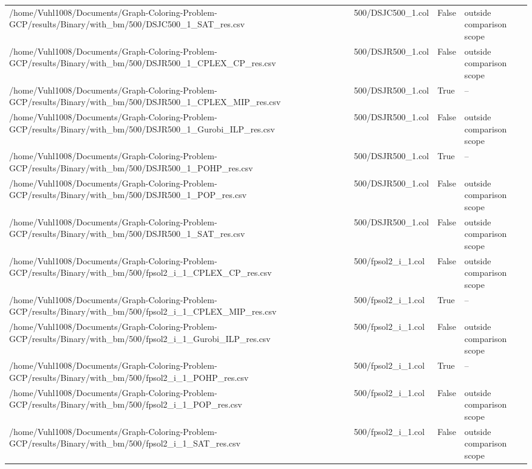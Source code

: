 \begin{table}[htbp]
\begin{tabular}{llll}
/home/Vuhl1008/Documents/Graph-Coloring-Problem-GCP/results/Binary/with\_bm/500/DSJC500\_1\_SAT\_res.csv & 500/DSJC500\_1.col & False & outside comparison scope \\
/home/Vuhl1008/Documents/Graph-Coloring-Problem-GCP/results/Binary/with\_bm/500/DSJR500\_1\_CPLEX\_CP\_res.csv & 500/DSJR500\_1.col & False & outside comparison scope \\
/home/Vuhl1008/Documents/Graph-Coloring-Problem-GCP/results/Binary/with\_bm/500/DSJR500\_1\_CPLEX\_MIP\_res.csv & 500/DSJR500\_1.col & True & -- \\
/home/Vuhl1008/Documents/Graph-Coloring-Problem-GCP/results/Binary/with\_bm/500/DSJR500\_1\_Gurobi\_ILP\_res.csv & 500/DSJR500\_1.col & False & outside comparison scope \\
/home/Vuhl1008/Documents/Graph-Coloring-Problem-GCP/results/Binary/with\_bm/500/DSJR500\_1\_POHP\_res.csv & 500/DSJR500\_1.col & True & -- \\
/home/Vuhl1008/Documents/Graph-Coloring-Problem-GCP/results/Binary/with\_bm/500/DSJR500\_1\_POP\_res.csv & 500/DSJR500\_1.col & False & outside comparison scope \\
/home/Vuhl1008/Documents/Graph-Coloring-Problem-GCP/results/Binary/with\_bm/500/DSJR500\_1\_SAT\_res.csv & 500/DSJR500\_1.col & False & outside comparison scope \\
/home/Vuhl1008/Documents/Graph-Coloring-Problem-GCP/results/Binary/with\_bm/500/fpsol2\_i\_1\_CPLEX\_CP\_res.csv & 500/fpsol2\_i\_1.col & False & outside comparison scope \\
/home/Vuhl1008/Documents/Graph-Coloring-Problem-GCP/results/Binary/with\_bm/500/fpsol2\_i\_1\_CPLEX\_MIP\_res.csv & 500/fpsol2\_i\_1.col & True & -- \\
/home/Vuhl1008/Documents/Graph-Coloring-Problem-GCP/results/Binary/with\_bm/500/fpsol2\_i\_1\_Gurobi\_ILP\_res.csv & 500/fpsol2\_i\_1.col & False & outside comparison scope \\
/home/Vuhl1008/Documents/Graph-Coloring-Problem-GCP/results/Binary/with\_bm/500/fpsol2\_i\_1\_POHP\_res.csv & 500/fpsol2\_i\_1.col & True & -- \\
/home/Vuhl1008/Documents/Graph-Coloring-Problem-GCP/results/Binary/with\_bm/500/fpsol2\_i\_1\_POP\_res.csv & 500/fpsol2\_i\_1.col & False & outside comparison scope \\
/home/Vuhl1008/Documents/Graph-Coloring-Problem-GCP/results/Binary/with\_bm/500/fpsol2\_i\_1\_SAT\_res.csv & 500/fpsol2\_i\_1.col & False & outside comparison scope \\

\end{tabular}
\end{table}
